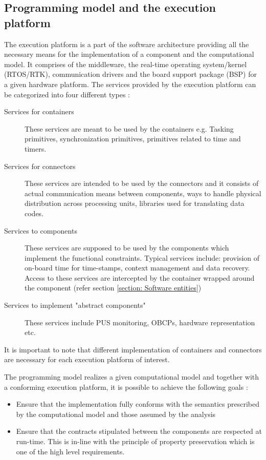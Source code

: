 \subsection{Programming model and the execution platform}
\label{section: Execution platform}
The execution platform is a part of the software architecture providing all the necessary means for the implementation of a component and the computational model. It comprises of the middleware, the real-time operating system/kernel (RTOS/RTK), communication drivers and the board support package (BSP) for a given hardware platform. The services provided by the execution platform can be categorized into four different types \cite{SAVOIR}:

\begin{description}
\item [Services for containers] These services are meant to be used by the containers e.g. Tasking primitives, synchronization primitives, primitives related to time and timers.

\item [Services for connectors] These services are intended to be used by the connectors and it consists of actual communication means between components, ways to handle physical distribution across processing units, libraries used for translating data codes.

\item [Services to components] These services are supposed to be used by the components which implement the functional constraints. Typical services include: provision of on-board time for time-stamps, context management and data recovery. Access to these services are intercepted by the container wrapped around the component (refer section \cref{section: Software entities})

\item [Services to implement "abstract components"] These services include PUS monitoring, OBCPs, hardware representation etc.
\end{description}

It is important to note that different implementation of containers and connectors are necessary for each execution platform of interest.

The programming model realizes a given computational model and together with a conforming execution platform, it is possible to achieve the following goals \cite{PhdThesis}:

\begin{itemize}
\item Ensure that the implementation fully conforms with the semantics prescribed by the computational model and those assumed by the analysis
\item Ensure that the contracts stipulated between the components are respected at run-time. This is in-line with the principle of property preservation which is one of the high level requirements.
\end{itemize} 

